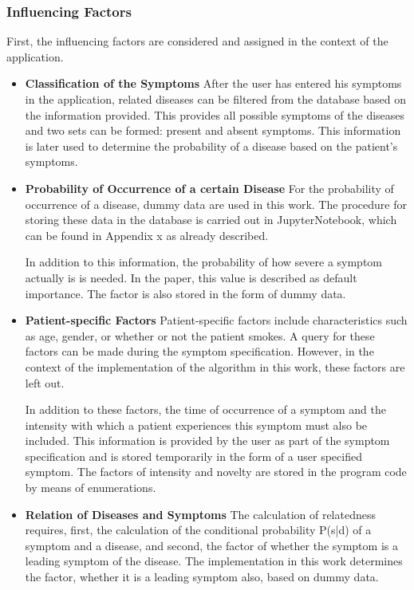 \subsubsection{Influencing Factors}
First, the influencing factors are considered and assigned in the context of the application.
\begin{itemize}
	\item \textbf{Classification of the Symptoms}
	\newline
	After the user has entered his symptoms in the application, related diseases can be filtered from the database based on the information provided. This provides all possible symptoms of the diseases and two sets can be formed: present and absent symptoms. This information is later used to determine the probability of a disease based on the patient's symptoms.

	\item \textbf{Probability of Occurrence of a certain Disease}
	\newline
	For the probability of occurrence of a disease, dummy data are used in this work. The procedure for storing these data in the database is carried out in JupyterNotebook, which can be found in Appendix x as already described. 
	
	In addition to this information, the probability of how severe a symptom actually is is needed. In the paper, this value is described as default importance. The factor is also stored in the form of dummy data.
	
	\item \textbf{Patient-specific Factors}
	\newline
	Patient-specific factors include characteristics such as age, gender, or whether or not the patient smokes. A query for these factors can be made during the symptom specification. However, in the context of the implementation of the algorithm in this work, these factors are left out.
	
	In addition to these factors, the time of occurrence of a symptom and the intensity with which a patient experiences this symptom must also be included. This information is provided by the user as part of the symptom specification and is stored temporarily in the form of a user specified symptom. The factors of intensity and novelty are stored in the program code by means of enumerations. 
	
	\item \textbf{Relation of Diseases and Symptoms}
	\newline
	The calculation of relatedness requires, first, the calculation of the conditional probability P(s|d) of a symptom and a disease, and second, the factor of whether the symptom is a leading symptom of the disease.  The implementation in this work determines the factor, whether it is a leading symptom also, based on dummy data.
\end{itemize}
